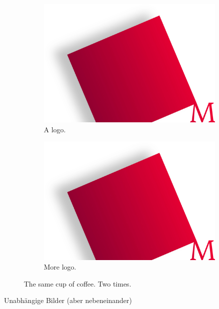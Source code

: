 \documentclass[\maintextsize, \papersize, fleqn, xcolor=dvipsnames]{scrartcl}
\begin{document}
\begin{figure}[H]
  	\centering
  	\begin{subfigure}[b]{0.4\textwidth}
    	\includegraphics[width=\textwidth]{logo}
    	\caption{A logo.}
  	\end{subfigure}
  	\begin{subfigure}[b]{0.4\textwidth}
    	\includegraphics[width=\textwidth]{logo}
    	\caption{More logo.}
  	\end{subfigure}
  	\caption{The same cup of coffee. Two times.}
  	\label{fig:coffee}
\end{figure}
	
Unabhängige Bilder (aber nebeneinander)
	
\end{document}
